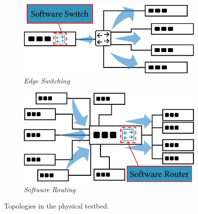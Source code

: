 \begin{figure}[t]
	\centering
	\begin{subfigure}[t]{.49\linewidth}
		\centering\includegraphics[width=1\linewidth]{figs/testbed2-crop.pdf}
                \vspace{-6mm}
		\caption{\small{\textit{Edge Switching}}}
                \label{fig:testbed-switching}

	\end{subfigure}
	\begin{subfigure}[t]{.46\linewidth}
		\centering\includegraphics[width=1\linewidth]{figs/testbed1-crop.pdf}
                \vspace{-6mm}
		\caption{\small{\textit{Software Routing}}}
                \label{fig:testbed-routing}

	\end{subfigure}
        \vspace{-3mm}
	\caption{\small{
                Topologies in the physical testbed.}
	}
	\label{fig:testbed}
	\vspace*{-4mm}

\end{figure}


